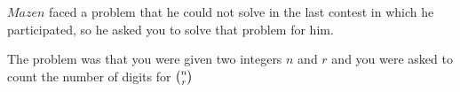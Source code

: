 $ Mazen$ faced a problem that he could not solve in the last contest in which he participated, so he asked you to solve that problem for him.

The problem was that you were given two integers $n$ and $r$ and you were asked to count the number of digits for $\large\binom{n}{r}$